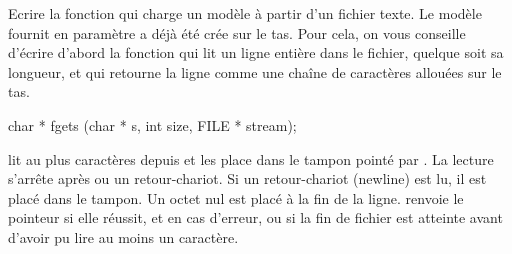 Ecrire la fonction  qui charge un modèle à partir d'un fichier texte. Le modèle fournit en paramètre a déjà été crée sur le tas. Pour cela, on vous conseille d'écrire d'abord la fonction  qui lit un ligne entière dans le fichier, quelque soit sa longueur, et qui retourne la ligne comme une chaîne de caractères allouées sur le tas.

\begin{csource}
char * fgets (char * s, int size, FILE * stream);
\end{csource}
 lit au plus  caractères depuis  et les place dans le tampon pointé par .  La lecture s'arrête après  ou un retour-chariot. Si un retour-chariot (newline) est  lu,  il est placé dans le tampon. Un octet nul \ccode{\0} est placé à  la fin de la ligne.  renvoie le pointeur  si elle réussit, et  en cas d'erreur, ou si la fin de fichier est atteinte avant d'avoir pu lire au moins un caractère.

